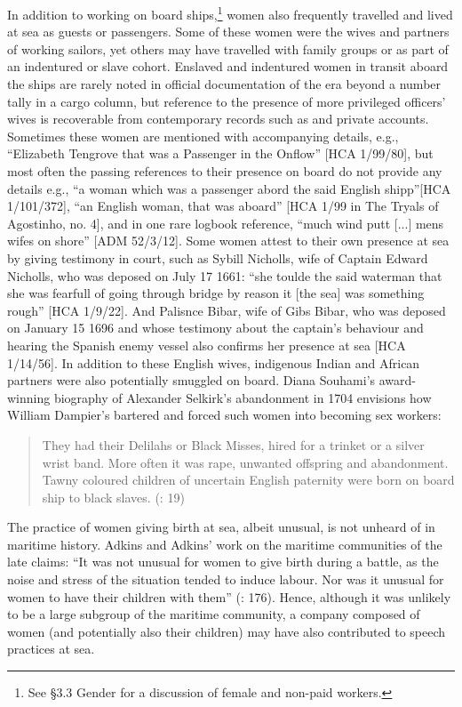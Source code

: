 In addition to working on board ships,\footnote{See §3.3 Gender for a discussion of female  and non-paid workers.} women also frequently travelled and lived at sea as guests or passengers. Some of these women were the wives and partners of working sailors, yet others may have travelled with family groups or as part of an indentured or slave cohort. Enslaved and indentured women in transit aboard the ships are rarely noted in official documentation of the era beyond a number tally in a cargo column, but reference to the presence of more privileged officers’ wives is recoverable from contemporary records such as  and private accounts. Sometimes these women are mentioned with accompanying details, e.g., “Elizabeth Tengrove that was a Passenger in the Onflow” [HCA 1/99/80], but most often the passing references to their presence on board do not provide any details e.g., “a woman which was a passenger abord the said English shipp”[HCA 1/101/372], “an English woman, that was aboard” [HCA 1/99 in The Tryals of Agostinho, no. 4], and in one rare logbook reference, “much wind putt [...] mens wifes on shore” [ADM 52/3/12]. Some women attest to their own presence at sea by giving testimony in court, such as Sybill Nicholls, wife of Captain Edward Nicholls, who was deposed on July 17 1661: “she toulde the said waterman that she was fearfull of going through bridge by reason it [the sea] was something rough” [HCA 1/9/22]. And Palisnce Bibar, wife of  Gibs Bibar, who was deposed on January 15 1696 and whose testimony about the captain's behaviour and hearing the Spanish enemy vessel also confirms her presence at sea [HCA 1/14/56]. In addition to these English wives, indigenous Indian and African partners were also potentially smuggled on board. Diana Souhami’s award-winning biography of Alexander Selkirk’s abandonment in 1704 envisions how William Dampier’s  bartered and forced such women into becoming sex workers:

\begin{quotation}
They had their Delilahs or Black Misses, hired for a trinket or a silver wrist band. More often it was rape, unwanted offspring and abandonment. Tawny coloured children of uncertain English paternity were born on board ship to black slaves. (\citealt{Souhami2013}: 19)\end{quotation}

The practice of women giving birth at sea, albeit unusual, is not unheard of in maritime history. Adkins and Adkins’ work on the maritime communities of the late  claims: “It was not unusual for women to give birth during a battle, as the noise and stress of the situation tended to induce labour. Nor was it unusual for women to have their children with them” (\citealt{AdkinsAdkins2008}: 176). Hence, although it was unlikely to be a large subgroup of the maritime community, a company composed of women (and potentially also their children) may have also contributed to speech practices at sea. 

